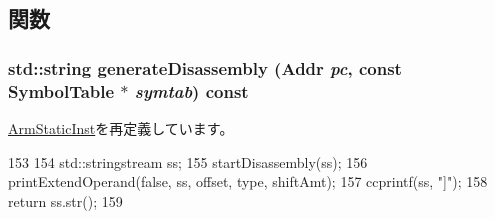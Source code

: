 \subsection{関数}
\hypertarget{classArmISA_1_1MemoryReg64_a95d323a22a5f07e14d6b4c9385a91896}{
\subsubsection[{generateDisassembly}]{\setlength{\rightskip}{0pt plus 5cm}std::string generateDisassembly ({\bf Addr} {\em pc}, \/  const SymbolTable $\ast$ {\em symtab}) const}}
\label{classArmISA_1_1MemoryReg64_a95d323a22a5f07e14d6b4c9385a91896}


\hyperlink{classArmISA_1_1ArmStaticInst_a95d323a22a5f07e14d6b4c9385a91896}{ArmStaticInst}を再定義しています。


\begin{DoxyCode}
153 {
154     std::stringstream ss;
155     startDisassembly(ss);
156     printExtendOperand(false, ss, offset, type, shiftAmt);
157     ccprintf(ss, "]");
158     return ss.str();
159 }
\end{DoxyCode}


